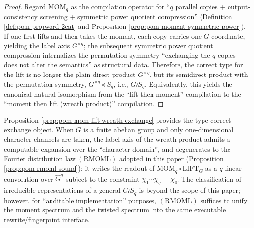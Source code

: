 \begin{proof}
Regard \(\mathrm{MOM}_q\) as the compilation operator for ``\(q\) parallel copies + output-consistency screening + symmetric power quotient compression'' (Definition \ref{def:pom-projword-2cat} and Proposition \ref{prop:pom-moment-symmetric-power}).
If one first lifts and then takes the moment, each copy carries one \(G\)-coordinate, yielding the label axis \(G^{\times q}\); the subsequent symmetric power quotient compression internalizes the permutation symmetry ``exchanging the \(q\) copies does not alter the semantics'' as structural data.
Therefore, the correct type for the lift is no longer the plain direct product \(G^{\times q}\), but its semidirect product with the permutation symmetry, \(G^{\times q}\rtimes S_q\), i.e., \(G\wr S_q\).
Equivalently, this yields the canonical natural isomorphism from the ``lift then moment'' compilation to the ``moment then lift (wreath product)'' compilation.
\end{proof}

\begin{remark}\label{rem:pom-wreath-shadow-rmoml}
Proposition \ref{prop:pom-mom-lift-wreath-exchange} provides the type-correct exchange object.
When \(G\) is a finite abelian group and only one-dimensional character channels are taken, the label axis of the wreath product admits a computable expansion over the ``character domain'',
and degenerates to the Fourier distribution law \((\mathrm{RMOML})\) adopted in this paper (Proposition \ref{prop:pom-rmoml-sound}): it writes the readout of \(\mathrm{MOM}_q\circ \mathrm{LIFT}_G\) as a \(q\)-linear convolution over \(\widehat G^q\) subject to the constraint \(\chi_1\cdots\chi_q=\chi_0\).
The classification of irreducible representations of a general \(G\wr S_q\) is beyond the scope of this paper; however, for ``auditable implementation'' purposes, \((\mathrm{RMOML})\) suffices to unify the moment spectrum and the twisted spectrum into the same executable rewrite/fingerprint interface.
\end{remark}

